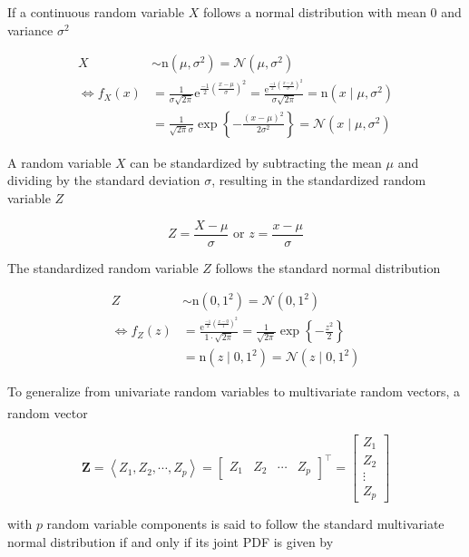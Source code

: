 \documentclass[
]{book}
\theoremstyle{definition}
\theoremstyle{definition}
\theoremstyle{definition}
\theoremstyle{definition}
\theoremstyle{remark}
\begin{document}
If a continuous random variable \(X\) follows a normal distribution with mean 0 and variance \(\sigma^2\)

\[
\begin{aligned}
X & \sim \mathrm{n}\left(\mu, \sigma^2\right)=\mathcal{N}\left(\mu, \sigma^2\right) \\
\Leftrightarrow f_X(x) 
& =\frac{1}{\sigma \sqrt{2 \pi}}\mathrm{e}^{\frac{-1}{2}\left(\frac{x-\mu}{\sigma}\right)^2}
=\frac{\mathrm{e}^{\frac{-1}{2}\left(\frac{x-\mu}{\sigma}\right)^2}}{\sigma \sqrt{2 \pi}}
=\mathrm{n}\left(x \mid \mu, \sigma^2\right) \\
& =\frac{1}{\sqrt{2 \pi} \sigma} \exp \left\{-\frac{(x-\mu)^2}{2 \sigma^2}\right\}
=\mathcal{N}\left(x \mid \mu, \sigma^2\right) 
\end{aligned}
\]

A random variable \(X\) can be standardized by subtracting the mean \(\mu\) and dividing by the standard deviation \(\sigma\), resulting in the standardized random variable \(Z\)

\[
Z=\dfrac{X-\mu}{\sigma}\text{ or } z=\dfrac{x-\mu}{\sigma}
\]

The standardized random variable \(Z\) follows the standard normal distribution

\[
\begin{aligned}
Z & \sim \mathrm{n}\left(0,1^2\right)=\mathcal{N}\left(0,1^2\right) \\
\Leftrightarrow f_Z(z) & =\frac{\mathrm{e}^{\frac{-1}{2}\left(\frac{x-0}{1}\right)^2}}{1 \cdot \sqrt{2 \pi}}=\frac{1}{\sqrt{2 \pi}} \exp \left\{-\frac{z^2}{2}\right\} \\
& =\mathrm{n}\left(z \mid 0,1^2\right)=\mathcal{N}\left(z \mid 0,1^2\right)
\end{aligned}
\]

To generalize from univariate random variables to multivariate random vectors, a random vector\textsuperscript{}

\[
\boldsymbol{Z}=\left\langle Z_{1},Z_{2},\cdots,Z_{p}\right\rangle =\begin{bmatrix}Z_{1} & Z_{2} & \cdots & Z_{p}\end{bmatrix}^{\intercal}=\begin{bmatrix}Z_{1}\\
Z_{2}\\
\vdots\\
Z_{p}
\end{bmatrix}
\]

with \(p\) random variable components is said to follow the standard multivariate normal distribution if and only if its joint PDF is given by
\end{document}

